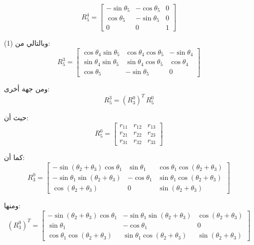 \[
R_5^4 =
\begin{bmatrix}
- \sin\theta_5 & - \cos\theta_5 & 0 \\
\cos\theta_5 & - \sin\theta_5 & 0 \\
0 & 0 & 1
\end{bmatrix}
\]

وبالتالي من (1):
\begin{equation}
R_5^3 =
\begin{bmatrix}
\cos\theta_4 \sin\theta_5 & \cos\theta_4 \cos\theta_5 & - \sin\theta_4 \\
\sin\theta_4 \sin\theta_5 & \sin\theta_4 \cos\theta_5 & \cos\theta_4 \\
\cos\theta_5 & - \sin\theta_5 & 0
\end{bmatrix}
\tag{2}
\end{equation}

ومن جهة أخرى:
\begin{equation}
R_5^3 = (R_3^0)^T \, R_5^0
\tag{3}
\end{equation}

حيث أن:
\[
R_5^0 =
\begin{bmatrix}
r_{11} & r_{12} & r_{13} \\
r_{21} & r_{22} & r_{23} \\
r_{31} & r_{32} & r_{33}
\end{bmatrix}
\]

كما أن:
\[
R_3^0 =
\begin{bmatrix}
- \sin(\theta_2+\theta_3)\cos\theta_1 & \sin\theta_1 & \cos\theta_1\cos(\theta_2+\theta_3) \\
- \sin\theta_1\sin(\theta_2+\theta_3) & - \cos\theta_1 & \sin\theta_1\cos(\theta_2+\theta_3) \\
\cos(\theta_2+\theta_3) & 0 & \sin(\theta_2+\theta_3)
\end{bmatrix}
\]

ومنها:
\begin{equation}
(R_3^0)^T =
\begin{bmatrix}
- \sin(\theta_2+\theta_3)\cos\theta_1 &
- \sin\theta_1\sin(\theta_2+\theta_3) &
\cos(\theta_2+\theta_3)
\\
\sin\theta_1 & - \cos\theta_1 & 0
\\
\cos\theta_1\cos(\theta_2+\theta_3) &
\sin\theta_1\cos(\theta_2+\theta_3) &
\sin(\theta_2+\theta_3)
\end{bmatrix}
\tag{4}
\end{equation}

